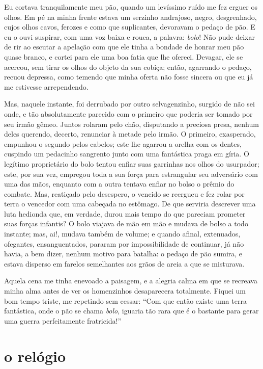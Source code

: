 Eu cortava tranquilamente meu pão, quando um levíssimo ruído me fez
erguer os olhos. Em pé na minha frente estava um serzinho andrajoso,
negro, desgrenhado, cujos olhos cavos, ferozes e como que suplicantes,
devoravam o pedaço de pão. E eu o ouvi suspirar, com uma voz baixa e
rouca, a palavra: \textit{bolo}! Não pude deixar de rir ao escutar a apelação
com que ele tinha a bondade de honrar meu pão quase branco, e cortei
para ele uma boa fatia que lhe ofereci. Devagar, ele se acercou,
sem tirar os olhos do objeto da sua cobiça; então, agarrando o pedaço,
recuou depressa, como temendo que minha oferta não fosse sincera ou
que eu já me estivesse arrependendo.

Mas, naquele instante, foi derrubado por outro selvagenzinho, surgido de
não sei onde, e tão absolutamente parecido com o primeiro que poderia
ser tomado por seu irmão gêmeo. Juntos rolaram pelo chão, disputando a
preciosa presa, nenhum deles querendo, decerto, renunciar à metade
pelo irmão. O primeiro, exasperado, empunhou o segundo pelos cabelos;
este lhe agarrou a orelha com os dentes, cuspindo um pedacinho
sangrento junto com uma fantástica praga em gíria. O legítimo proprietário do
bolo tentou enfiar suas garrinhas nos olhos do usurpador; este,
por sua vez, empregou toda a sua força para estrangular seu
adversário com uma das mãos, enquanto com a outra tentava enfiar no
bolso o prêmio do combate. Mas, reatiçado pelo desespero, o vencido
se reergueu e fez rolar por terra o vencedor com uma cabeçada no
estômago. De que serviria descrever uma luta hedionda que, em verdade,
durou mais tempo do que pareciam prometer suas forças infantis? O bolo
viajava de mão em mão e mudava de bolso a todo instante; mas, ai!,
mudava também de volume; e quando afinal, extenuados, ofegantes,
ensanguentados, pararam por impossibilidade de continuar, já não
havia, a bem dizer, nenhum motivo para batalha: o pedaço de pão sumira, e
estava disperso em farelos semelhantes aos grãos de areia a que se
misturava.

Aquela cena me tinha enevoado a paisagem, e a alegria calma em que
se recreava minha alma antes de ver os homenzinhos
desaparecera totalmente. Fiquei um bom tempo triste, me repetindo sem
cessar: ``Com que então existe uma terra fantástica, onde o pão
se chama \textit{bolo}, iguaria tão rara que é o bastante para gerar uma
guerra perfeitamente fratricida!''

\quebra\section[O relógio]{o relógio}

